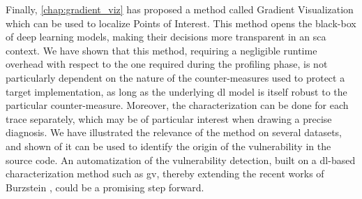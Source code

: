 	Finally, \autoref{chap:gradient_viz} has proposed a method called Gradient Visualization which can be used to localize Points of Interest.
	This method opens the black-box of deep learning models, making their decisions more transparent in an \gls{sca} context.
	We have shown that this method, requiring a negligible runtime overhead with respect to the one required during the profiling phase, is not particularly dependent on the nature of the counter-measures used to protect a target implementation, as long as the underlying \gls{dl} model is itself robust to the particular counter-measure.
	Moreover, the characterization can be done for each trace separately, which may be of particular interest when drawing a precise diagnosis.
	We have illustrated the relevance of the method on several datasets, and shown of it can be used to identify the origin of the vulnerability in the source code.
	An automatization of the vulnerability detection, built on a \gls{dl}-based characterization method such as \gls{gv}, thereby extending the recent works of Burzstein \etal{}, could be a promising step forward.

